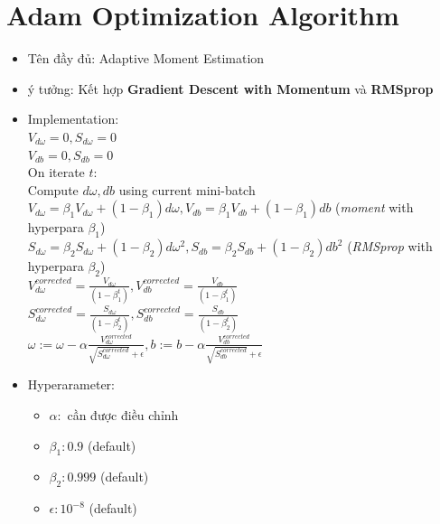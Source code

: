 \documentclass[12pt,a4paper]{report}
\begin{document}
	\section{Adam Optimization Algorithm}
		\begin{itemize}
			\item Tên đầy đủ: Adaptive Moment Estimation
			\item ý tưởng: Kết hợp \textbf{Gradient Descent with Momentum} và \textbf{RMSprop}
			\item Implementation: \\
				$ V_{d\omega} = 0, S_{d\omega} = 0 $ \\
				$ V_{db} = 0, S_{db} = 0 $ \\
				On iterate $t$: \\
				\tabto{0.5cm} Compute $ d\omega, db $ using current mini-batch\\
				\tabto{0.5cm} $ V_{d\omega} = \beta_1 V_{d\omega} + (1 - \beta_1) d\omega, V_{db} = \beta_1 V_{db} + (1 - \beta_1) db $ (\textit{moment} with hyperpara $ \beta_1 $)\\
				\tabto{0.5cm} $ S_{d\omega} = \beta_2 S_{d\omega} + (1 - \beta_2) d\omega^2, S_{db} = \beta_2 S_{db} + (1 - \beta_2) db^2 $ (\textit{RMSprop} with hyperpara $ \beta_2 $)\\
				\tabto{0.5cm} $ V_{d\omega}^{corrected} = \frac{V_{d\omega}}{(1 - \beta_1^t)}, V_{db}^{corrected} = \frac{V_{db}}{(1 - \beta_1^t)} $\\
				\vspace{8px}
				\tabto{0.5cm} $ S_{d\omega}^{corrected} = \frac{S_{d\omega}}{(1 - \beta_2^t)}, S_{db}^{corrected} = \frac{S_{db}}{(1 - \beta_2^t)} $\\
				\vspace{8px}
				\tabto{0.5cm} $ \omega := \omega - \alpha \frac{V_{d\omega}^{corrected}}{\sqrt{S_{d\omega}^{corrected}} + \epsilon}, b := b - \alpha \frac{V_{db}^{corrected}}{\sqrt{S_{db}^{corrected}} + \epsilon} $\\
			\item Hyperarameter:
				\begin{itemize}
					\item $ \alpha: $ cần được điều chỉnh
					\item $ \beta_1: 0.9 $ (default)
					\item $ \beta_2: 0.999 $ (default)
					\item $ \epsilon: 10^{-8} $ (default)
				\end{itemize}
		\end{itemize}
\end{document}
